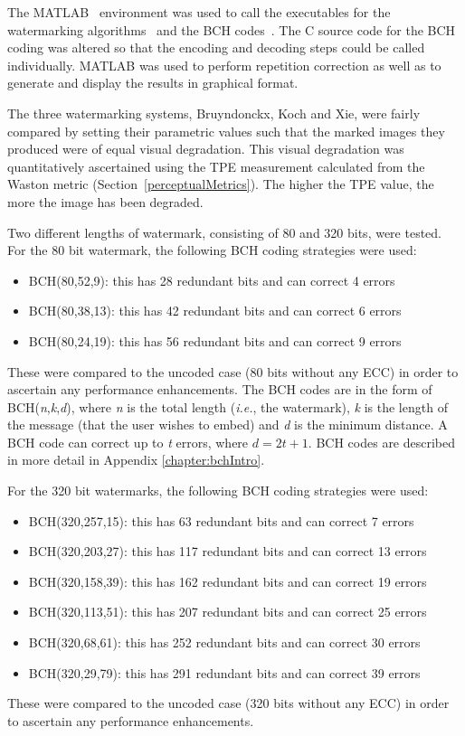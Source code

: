 \documentclass[12pt]{report}
\begin{document}
The MATLAB~\cite{matlab} environment was used to call the executables for the watermarking algorithms~\cite{meerMasters}
and the BCH codes~\cite{M_ZCONC}. The C source code for the BCH coding was altered so that the encoding and
decoding steps could be called individually. MATLAB was used to perform repetition correction as well as
to generate and display the results in graphical format.
			

The three watermarking systems, Bruyndonckx, Koch and Xie, were fairly compared by setting their parametric values such that
the marked images they produced were of equal visual degradation. This visual degradation was
quantitatively ascertained using the TPE measurement calculated from the 
Waston metric (Section~\ref{perceptualMetrics}).
The higher the TPE value, the more the image has been degraded.

Two different lengths of watermark, consisting of 80 and 320 bits, were tested. 
For the 80 bit watermark, the following BCH coding strategies were used:
\small
\begin{itemize}
	\item BCH(80,52,9): this has 28 redundant bits and can correct 4 errors
	\item BCH(80,38,13): this has 42 redundant bits and can correct 6 errors
	\item BCH(80,24,19): this has 56 redundant bits and can correct 9 errors
\end{itemize}
\normalsize
These were compared to the uncoded case (80 bits without any ECC) in order to ascertain any performance enhancements.
The BCH codes are in the form of BCH(\emph{n},\emph{k},\emph{d}),
where \emph{n} is the total length (\emph{i.e.}, the watermark), \emph{k} is the length of the message (that the user wishes to embed)
and \emph{d} is the minimum distance. A BCH code can correct up to \emph{t} errors, where $d = 2t + 1$.
BCH codes are described in more detail in Appendix \ref{chapter:bchIntro}.

For the 320 bit watermarks, the following BCH coding strategies were used: 
\small
\begin{itemize}
	\item BCH(320,257,15): this has 63 redundant bits and can correct 7 errors
	\item BCH(320,203,27): this has 117 redundant bits and can correct 13 errors
	\item BCH(320,158,39): this has 162 redundant bits and can correct 19 errors
	\item BCH(320,113,51): this has 207 redundant bits and can correct 25 errors
	\item BCH(320,68,61): this has 252 redundant bits and can correct 30 errors
	\item BCH(320,29,79): this has 291 redundant bits and can correct 39 errors
\end{itemize}
\normalsize
These were compared to the uncoded case (320 bits without any ECC) in order to ascertain any performance enhancements.
\end{document}
